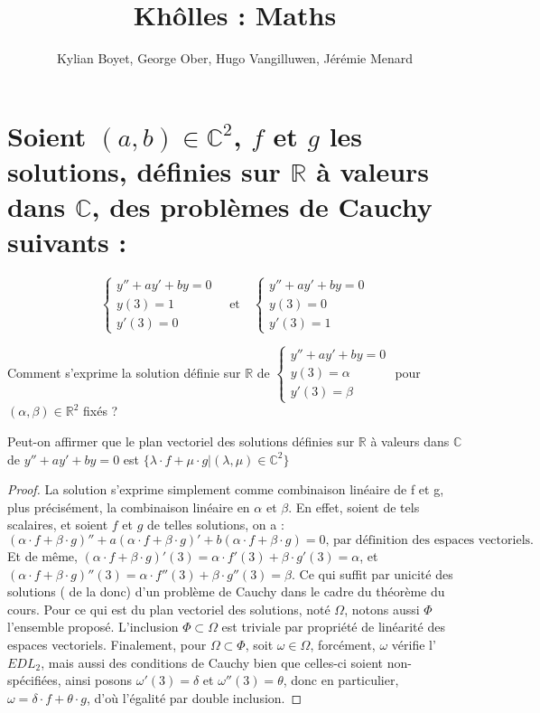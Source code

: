 \documentclass{article}
\title{Khôlles : Maths}
\author{Kylian Boyet, George Ober, Hugo Vangilluwen, Jérémie Menard}
\begin{document}
\maketitle

\section{Soient $(a,b)\in \mathbb{C}^2$, $f$ et $g$ les  solutions, définies sur $\mathbb{R}$ à valeurs
  dans $\mathbb{C}$, des problèmes de Cauchy suivants :}


\[
	\left\{ \begin{array}{cl}
		y'' +ay'+by = 0 \\
		y(3) = 1        \\
		y'(3) = 0
	\end{array} \right.
	\quad \text{et} \quad
	\left\{ \begin{array}{cl}
		y'' +ay'+by = 0 \\
		y(3) = 0        \\
		y'(3) = 1
	\end{array} \right.
\]

Comment s'exprime la solution définie sur $\mathbb{R}$ de $\left\{ \begin{array}{cl}
		y'' +ay'+by = 0 \\
		y(3) = \alpha   \\
		y'(3) = \beta
	\end{array} \right. $ pour $(\alpha, \beta)\in \mathbb{R}^2$ fixés ?

Peut-on affirmer que le plan vectoriel des solutions définies sur $\mathbb{R}$ à valeurs dans
$\mathbb{C}$ de $y'' + ay' + by = 0$ est $\{ \lambda \cdot f + \mu \cdot g  |
	(\lambda, \mu)\in \mathbb{C}^2\}$

\begin{proof}
	La solution s'exprime simplement comme combinaison linéaire de f et g, plus précisément, la
	combinaison linéaire en $\alpha$ et $\beta$. En effet, soient de tels scalaires, et soient $f$ et
	$g$ de telles solutions, on a :
	\[
		(\alpha \cdot f + \beta \cdot g)'' + a (\alpha \cdot f + \beta \cdot g)' + b (\alpha \cdot f +
		\beta \cdot g) = 0 \text{, par définition des espaces vectoriels.}
	\]
	Et de même, $(\alpha \cdot f + \beta \cdot g)'(3) = \alpha \cdot f'(3) + \beta \cdot g'(3) = \alpha$,
	et $(\alpha \cdot f + \beta \cdot g)''(3) = \alpha \cdot f''(3) + \beta \cdot g''(3) = \beta$.
	\newline
	Ce qui suffit par unicité des solutions ( de la donc) d'un problème de Cauchy dans le cadre du
	théorème du cours.
	\newline
	Pour ce qui est du plan vectoriel des solutions, noté $\Omega$, notons aussi $\Phi$ l'ensemble proposé.
	L'inclusion $\Phi \subset \Omega$ est triviale par propriété de linéarité des espaces vectoriels.
	Finalement, pour $\Omega \subset \Phi$, soit $\omega \in \Omega$, forcément, $\omega$ vérifie
	l'$EDL_2$, mais aussi des conditions de Cauchy bien que celles-ci soient non-spécifiées, ainsi
	posons $\omega'(3) = \delta$ et $\omega''(3) = \theta$, donc en particulier, $ \omega =
		\delta \cdot f + \theta \cdot g$, d'où l'égalité par double inclusion.
\end{proof}
\end{document}
